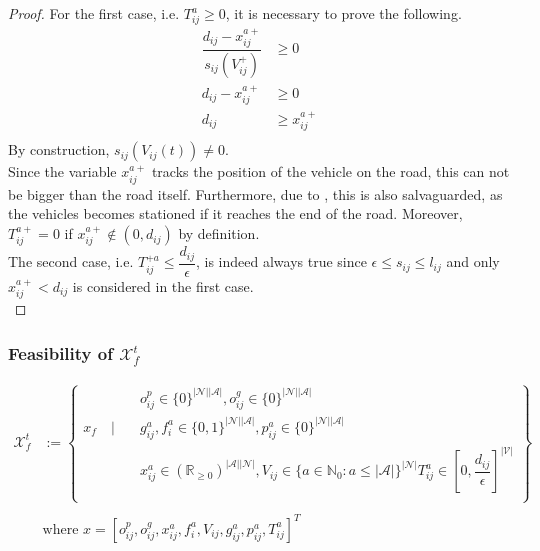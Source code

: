 \begin{proof}
For the first case, i.e. $T_{ij}^{a} \ge 0$, it is necessary to prove the following. 
\begin{align*}
	\dfrac{d_{ij} - x_{ij}^{a+}}{s_{ij}(V^+_{ij})} &\ge 0\\
	d_{ij} - x_{ij}^{a+} &\ge 0\\
	d_{ij} &\ge x_{ij}^{a+}\\
\end{align*}
By construction, $s_{ij}(V_{ij}(t)) \neq 0$.\\
Since the variable $x_{ij}^{a+}$ tracks the position of the vehicle on the road, this can not be bigger than the road itself. Furthermore, due to , this is also salvaguarded, as the vehicles becomes stationed if it reaches the end of the road. Moreover, $T_{ij}^{a+} =0$ if $x_{ij}^{a+} \not\in  (0,d_{ij})$ by definition. \\
The second case, i.e. $T_{ij}^{+a} \leq \dfrac{d_{ij}}{\epsilon}$, is indeed always true since $\epsilon \leq s_{ij} \leq l_{ij}$ and only $x_{ij}^{a+} < d_{ij}$ is considered in the first case.\\
\end{proof}
\subsubsection{Feasibility of $\mathcal{X}^t_f$}
\begin{equation}
	\begin{aligned}
		\mathcal{X}^t_f &:= \left\{
		\begin{aligned}
			& o^p_{ij} \in \{0\}^{|\mathcal{N}||\mathcal{A}|} , o^g_{ij} \in \{0\}^{|\mathcal{N}||\mathcal{A}|}  \\
			x_f \quad \Bigg| \quad &g^a_{ij},f^a_{i} \in \{0,1\}^{|\mathcal{N}||\mathcal{A}|},  p^a_{ij}\in \{0\}^{|\mathcal{N}||\mathcal{A}|}\\%
			&  x_{ij}^a\in (\mathbb{R}_{\ge 0})^{|\mathcal{A}||\mathcal{N}|}, V_{ij} \in \{ a \in \mathbb{N}_0: a \leq |\mathcal{A}| \}^{|\mathcal{N}|} T^a_{ij} \in [0, \dfrac{d_{ij}}{\epsilon}]^{|\mathcal{V}|}\\%
		\end{aligned}
		\right\}\\
		&\\
		&\text{where }  x = [o^p_{ij},o^g_{ij}, x_{ij}^a, f^a_{i}, V_{ij} , g^a_{ij}, p^a_{ij}, T^a_{ij}]^T
	\end{aligned}
	\label{appendix:eq:final_x_f}
\end{equation}\\

